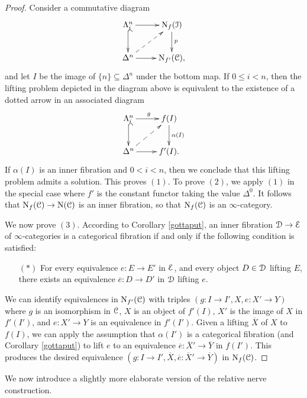 \begin{proof}
Consider a commutative diagram
$$ \xymatrix{ \Lambda^n_i \ar[r] \ar@{^{(}->}[d] & \Nerve_{f}(\calI) \ar[d]^{p} \\
\Delta^n \ar@{-->}[ur] \ar[r] & \Nerve_{f'}(\calC), }$$
and let $I$ be the image of $\{n\} \subseteq \Delta^n$ under the
bottom map. If $0 \leq i < n$, then the lifting problem depicted in the diagram above is equivalent to the existence of a dotted arrow in an associated diagram
$$ \xymatrix{ \Lambda^n_i \ar[r]^{g} \ar@{^{(}->}[d] & f(I) \ar[d]^{\alpha(I)} \\
\Delta^n \ar@{-->}[ur] \ar[r] & f'(I).}$$
If $\alpha(I)$ is an inner fibration and $0 < i < n$, then we conclude that this lifting problem admits a solution. This proves $(1)$. To prove $(2)$, we apply $(1)$ in the special case where $f'$ is the constant functor taking the value $\Delta^0$. It follows that $\operatorname{N}_{f}(\operatorname{\mathcal{C}}) \rightarrow \operatorname{N}(\operatorname{\mathcal{C}})$ is an inner fibration, so that $\operatorname{N}_{f}(\operatorname{\mathcal{C}})$ is an $\infty$-category.

We now prove $(3)$. According to Corollary \ref{gottaput}, an inner fibration
$\operatorname{\mathcal{D}} \rightarrow \operatorname{\mathcal{E}}$ of $\infty$-categories is a categorical fibration if and only if the following condition is satisfied:
\begin{itemize}
\item[$(\ast)$] For every equivalence $e: E \rightarrow E'$ in $\operatorname{\mathcal{E}}$, and every
object $D \in \operatorname{\mathcal{D}}$ lifting $E$, there exists an equivalence $\overline{e}: D \rightarrow D'$
in $\operatorname{\mathcal{D}}$ lifting $e$.
\end{itemize}

We can identify equivalences in $\operatorname{N}_{f'}(\operatorname{\mathcal{C}})$ with triples
$(g: I \rightarrow I', X, e: X' \rightarrow Y)$ where $g$ is an isomorphism in $\operatorname{\mathcal{C}}$, $X$ is an object
of $f'(I)$, $X'$ is the image of $X$ in $f'(I')$, and $e: X' \rightarrow Y$ is an equivalence in
$f'(I')$. Given a lifting $\overline{X}$ of $X$ to $f(I)$, we can apply the assumption that
$\alpha(I')$ is a categorical fibration (and Corollary \ref{gottaput}) to lift $e$ to an equivalence $\overline{e}: \overline{X}' \rightarrow \overline{Y}$ in $f(I')$. This produces the desired equivalence
$(g: I \rightarrow I', \overline{X}, \overline{e}: \overline{X}' \rightarrow \overline{Y})$ in
$\operatorname{N}_{f}(\operatorname{\mathcal{C}})$.
\end{proof}

We now introduce a slightly more elaborate version of the relative nerve construction.

